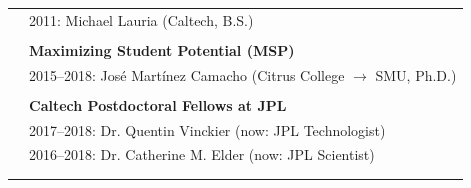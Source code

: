 \documentclass[letterpaper,10pt,twoside]{article}
\begin{document}
\begin{tabular}{@{} l l}
 & \hspace{0.25in} 2011: Michael Lauria (Caltech, B.S.) \\
 & \\
 & \textbf{Maximizing Student Potential (MSP)} \\
 & \hspace{0.25in} 2015--2018: Jos{\'e} Mart{\'i}nez Camacho (Citrus College $\rightarrow$ SMU, Ph.D.) \\
 & \\
 & \textbf{Caltech Postdoctoral Fellows at JPL} \\
 & \hspace{0.25in} 2017--2018: Dr. Quentin Vinckier (now: JPL Technologist) \\
 & \hspace{0.25in} 2016--2018: Dr. Catherine M. Elder (now: JPL Scientist) \\
 & \\
 & \\

 \end{tabular}

\vspace{0.05in}
\end{document}
